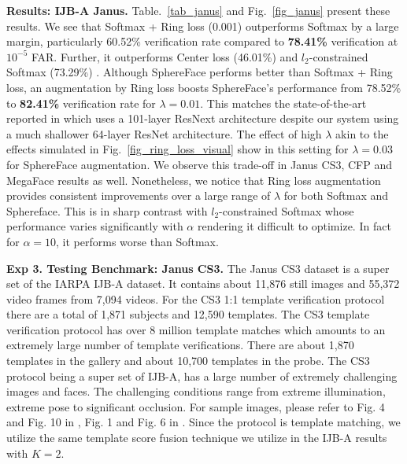 \documentclass[10pt,twocolumn,letterpaper]{article}
\begin{document}
\textbf{Results: IJB-A Janus.} Table.~\ref{tab_janus} and Fig.~\ref{fig_janus} present these results. We see that Softmax + Ring loss (0.001) outperforms Softmax by a large margin, particularly 60.52\% verification rate compared to \textbf{78.41\%} verification at $10^{-5}$ FAR. Further, it outperforms Center loss \cite{wen2016discriminative} (46.01\%) and $l_2$-constrained Softmax (73.29\%)  \cite{ranjan2017l2}. Although SphereFace performs better than Softmax + Ring loss, an augmentation by Ring loss boosts SphereFace's performance from 78.52\% to \textbf{82.41\%} verification rate for $\lambda=0.01$. This matches the state-of-the-art reported in \cite{ranjan2017l2} which uses a 101-layer ResNext architecture despite our system using a much shallower 64-layer ResNet architecture. The effect of high $\lambda$ akin to the effects simulated in Fig.~\ref{fig_ring_loss_visual} show in this setting for $\lambda=0.03$ for SphereFace augmentation. We observe this trade-off in Janus CS3, CFP and MegaFace results as well. Nonetheless, we notice that Ring loss augmentation provides consistent improvements over a large range of $\lambda$ for both Softmax and Sphereface. This is in sharp contrast with  $l_2$-constrained Softmax whose performance varies significantly with $\alpha$ rendering it difficult to optimize. In fact for $\alpha=10$, it performs worse than Softmax. 





\textbf{Exp 3. Testing Benchmark: Janus CS3.} The Janus CS3 dataset is a super set of the IARPA IJB-A dataset. It contains about 11,876 still images and 55,372 video frames from 7,094 videos. For the CS3 1:1 template verification protocol there are a total of 1,871 subjects and 12,590 templates. The CS3 template verification protocol has over 8 million template matches which amounts to an extremely large number of template verifications. There are about 1,870 templates in the gallery and about 10,700 templates in the probe. The CS3 protocol being a super set of IJB-A, has a large number of extremely challenging images and faces. The challenging conditions range from extreme illumination, extreme pose to significant occlusion. For sample images, please refer to Fig. 4 and Fig. 10 in \cite{lin2017proximity}, Fig. 1 and Fig. 6 in \cite{bodla2017deep}. Since the protocol is template matching, we utilize the same template score fusion technique we utilize in the IJB-A results with $K=2$.
\end{document}
